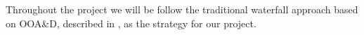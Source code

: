 Throughout the project we will be follow the traditional waterfall  approach based on OOA\&D, described in \cite{mathiassen2001objektorienteret}, as the strategy for our project.

